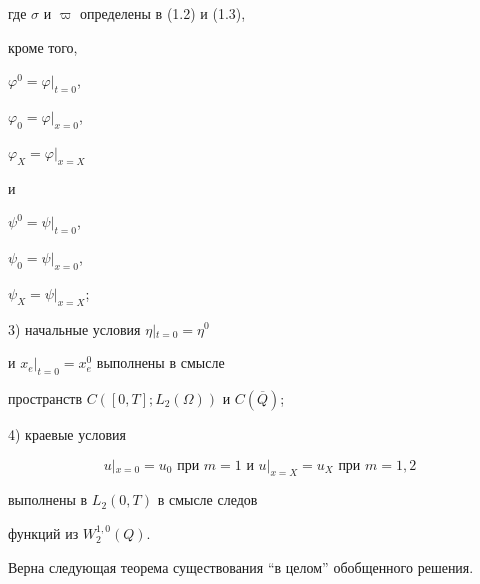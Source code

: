 \documentclass[12pt]{article}
\theoremstyle{plain} %
\theoremstyle{definition}
\numberwithin{equation}{section}
\begin{document}
где $\sigma$ и $\varpi$ определены в (1.2) и (1.3),


кроме того,


$\varphi^0 = \left.\varphi\right|_{t=0}$,


$\varphi_0 = \left.\varphi\right|_{x=0}$,


$\varphi_X = \left.\varphi\right|_{x=X}$


и


$\psi^0 = \left.\psi\right|_{t=0}$,


$\psi_0 = \left.\psi\right|_{x=0}$,


$\psi_X = \left.\psi\right|_{x=X}$;





3) начальные условия $\eta\left|_{t=0}\right.=\eta^0$


и $x_e|_{t=0}=x_e^0$ выполнены в смысле


пространств $C([0,T];L_2(\Omega))$ и $C(\overline Q)$;





4) краевые условия


\begin{equation}


u|_{x=0}=u_{0} \text{ при } m=1\text{ и }u|_{x=X}=u_{X}\text{ при } m=1,2


\tag{1.12}


\end{equation}


выполнены в $L_2(0,T)$  в смысле следов


функций  из $W_2^{1,0}(Q)$.





Верна следующая теорема существования ``в целом'' обобщенного решения.
\end{document}
